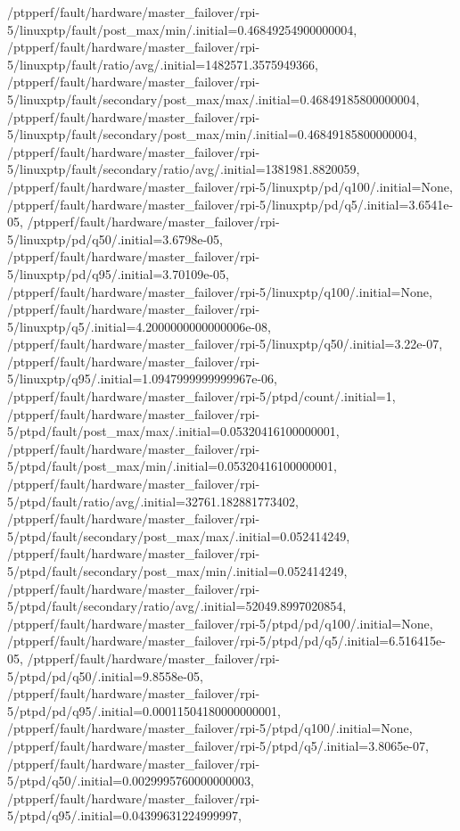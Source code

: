 {    /ptpperf/fault/hardware/master_failover/rpi-5/linuxptp/fault/post_max/min/.initial=0.46849254900000004,
    /ptpperf/fault/hardware/master_failover/rpi-5/linuxptp/fault/ratio/avg/.initial=1482571.3575949366,
    /ptpperf/fault/hardware/master_failover/rpi-5/linuxptp/fault/secondary/post_max/max/.initial=0.46849185800000004,
    /ptpperf/fault/hardware/master_failover/rpi-5/linuxptp/fault/secondary/post_max/min/.initial=0.46849185800000004,
    /ptpperf/fault/hardware/master_failover/rpi-5/linuxptp/fault/secondary/ratio/avg/.initial=1381981.8820059,
    /ptpperf/fault/hardware/master_failover/rpi-5/linuxptp/pd/q100/.initial=None,
    /ptpperf/fault/hardware/master_failover/rpi-5/linuxptp/pd/q5/.initial=3.6541e-05,
    /ptpperf/fault/hardware/master_failover/rpi-5/linuxptp/pd/q50/.initial=3.6798e-05,
    /ptpperf/fault/hardware/master_failover/rpi-5/linuxptp/pd/q95/.initial=3.70109e-05,
    /ptpperf/fault/hardware/master_failover/rpi-5/linuxptp/q100/.initial=None,
    /ptpperf/fault/hardware/master_failover/rpi-5/linuxptp/q5/.initial=4.2000000000000006e-08,
    /ptpperf/fault/hardware/master_failover/rpi-5/linuxptp/q50/.initial=3.22e-07,
    /ptpperf/fault/hardware/master_failover/rpi-5/linuxptp/q95/.initial=1.0947999999999967e-06,
    /ptpperf/fault/hardware/master_failover/rpi-5/ptpd/count/.initial=1,
    /ptpperf/fault/hardware/master_failover/rpi-5/ptpd/fault/post_max/max/.initial=0.05320416100000001,
    /ptpperf/fault/hardware/master_failover/rpi-5/ptpd/fault/post_max/min/.initial=0.05320416100000001,
    /ptpperf/fault/hardware/master_failover/rpi-5/ptpd/fault/ratio/avg/.initial=32761.182881773402,
    /ptpperf/fault/hardware/master_failover/rpi-5/ptpd/fault/secondary/post_max/max/.initial=0.052414249,
    /ptpperf/fault/hardware/master_failover/rpi-5/ptpd/fault/secondary/post_max/min/.initial=0.052414249,
    /ptpperf/fault/hardware/master_failover/rpi-5/ptpd/fault/secondary/ratio/avg/.initial=52049.8997020854,
    /ptpperf/fault/hardware/master_failover/rpi-5/ptpd/pd/q100/.initial=None,
    /ptpperf/fault/hardware/master_failover/rpi-5/ptpd/pd/q5/.initial=6.516415e-05,
    /ptpperf/fault/hardware/master_failover/rpi-5/ptpd/pd/q50/.initial=9.8558e-05,
    /ptpperf/fault/hardware/master_failover/rpi-5/ptpd/pd/q95/.initial=0.00011504180000000001,
    /ptpperf/fault/hardware/master_failover/rpi-5/ptpd/q100/.initial=None,
    /ptpperf/fault/hardware/master_failover/rpi-5/ptpd/q5/.initial=3.8065e-07,
    /ptpperf/fault/hardware/master_failover/rpi-5/ptpd/q50/.initial=0.0029995760000000003,
    /ptpperf/fault/hardware/master_failover/rpi-5/ptpd/q95/.initial=0.04399631224999997,
}
